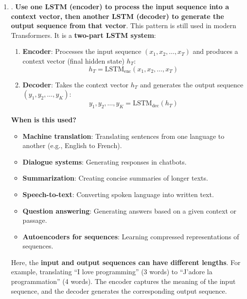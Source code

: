 \begin{enumerate}
    \item {}. \textbf{Use one LSTM (encoder) to process the input sequence into a context vector, then another LSTM (decoder) to generate the output sequence from that vector}. This pattern is still used in modern Transformers. It is a \textbf{two-part LSTM system}:
    \begin{enumerate}
        \item \textbf{Encoder}: Processes the input sequence $\left(x_1, x_2, \ldots, x_T\right)$ and produces a context vector (final hidden state) $h_T$:
        \begin{equation*}
            h_{T} = \text{LSTM}_{\text{enc}}\left(x_1, x_2, \ldots, x_T\right)
        \end{equation*}
        \item \textbf{Decoder}: Takes the context vector $h_T$ and generates the output sequence $\left(y_1, y_2, \ldots, y_{K}\right)$:
        \begin{equation*}
            y_1, y_2, \ldots, y_{K} = \text{LSTM}_{\text{dec}}\left(h_T\right)
        \end{equation*}
    \end{enumerate}
    \textcolor{Green3}{ \textbf{When is this used?}}
    \begin{itemize}
        \item \textbf{Machine translation}: Translating sentences from one language to another (e.g., English to French).
        \item \textbf{Dialogue systems}: Generating responses in chatbots.
        \item \textbf{Summarization}: Creating concise summaries of longer texts.
        \item \textbf{Speech-to-text}: Converting spoken language into written text.
        \item \textbf{Question answering}: Generating answers based on a given context or passage.
        \item \textbf{Autoencoders for sequences}: Learning compressed representations of sequences.
    \end{itemize}
    Here, the \textbf{input and output sequences can have different lengths}. For example, translating ``I love programming'' (3 words) to ``J'adore la programmation'' (4 words). The encoder captures the meaning of the input sequence, and the decoder generates the corresponding output sequence.



\end{enumerate}
